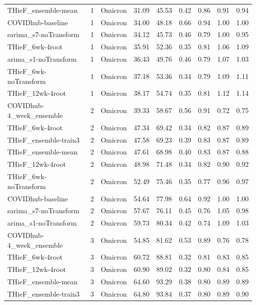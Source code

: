 \documentclass[thesis]{umassthesis}  %
\begin{document}
\begin{longtable}{lrlrrrrrr}
  THieF\_ensemble-mean & 1 & Omicron & 31.09 & 45.53 & 0.42 & 0.86 & 0.91 & 0.94 \\ 
  COVIDhub-baseline & 1 & Omicron & 34.00 & 48.18 & 0.66 & 0.94 & 1.00 & 1.00 \\ 
  sarima\_s7-noTransform & 1 & Omicron & 34.12 & 45.73 & 0.46 & 0.79 & 1.00 & 0.95 \\ 
  THieF\_6wk-4root & 1 & Omicron & 35.91 & 52.36 & 0.35 & 0.81 & 1.06 & 1.09 \\ 
  arima\_s1-noTransform & 1 & Omicron & 36.43 & 49.76 & 0.46 & 0.79 & 1.07 & 1.03 \\ 
  THieF\_6wk-noTransform & 1 & Omicron & 37.18 & 53.36 & 0.34 & 0.79 & 1.09 & 1.11 \\ 
  THieF\_12wk-4root & 1 & Omicron & 38.17 & 54.74 & 0.35 & 0.81 & 1.12 & 1.14 \\ 
  COVIDhub-4\_week\_ensemble & 2 & Omicron & 39.33 & 58.67 & 0.56 & 0.91 & 0.72 & 0.75 \\ 
  THieF\_6wk-4root & 2 & Omicron & 47.34 & 69.42 & 0.34 & 0.82 & 0.87 & 0.89 \\ 
  THieF\_ensemble-train3 & 2 & Omicron & 47.58 & 69.23 & 0.39 & 0.83 & 0.87 & 0.89 \\ 
  THieF\_ensemble-mean & 2 & Omicron & 47.61 & 68.98 & 0.40 & 0.83 & 0.87 & 0.88 \\ 
  THieF\_12wk-4root & 2 & Omicron & 48.98 & 71.48 & 0.34 & 0.82 & 0.90 & 0.92 \\ 
  THieF\_6wk-noTransform & 2 & Omicron & 52.49 & 75.46 & 0.35 & 0.77 & 0.96 & 0.97 \\ 
  COVIDhub-baseline & 2 & Omicron & 54.64 & 77.98 & 0.64 & 0.92 & 1.00 & 1.00 \\ 
  sarima\_s7-noTransform & 2 & Omicron & 57.67 & 76.11 & 0.45 & 0.76 & 1.05 & 0.98 \\ 
  arima\_s1-noTransform & 2 & Omicron & 59.73 & 80.34 & 0.42 & 0.74 & 1.09 & 1.03 \\ 
  COVIDhub-4\_week\_ensemble & 3 & Omicron & 54.85 & 81.62 & 0.53 & 0.89 & 0.76 & 0.78 \\ 
  THieF\_6wk-4root & 3 & Omicron & 60.72 & 88.81 & 0.32 & 0.81 & 0.83 & 0.85 \\ 
  THieF\_12wk-4root & 3 & Omicron & 60.90 & 89.02 & 0.32 & 0.80 & 0.84 & 0.85 \\ 
  THieF\_ensemble-mean & 3 & Omicron & 64.60 & 93.29 & 0.38 & 0.80 & 0.89 & 0.89 \\ 
  THieF\_ensemble-train3 & 3 & Omicron & 64.80 & 93.84 & 0.37 & 0.80 & 0.89 & 0.90 \\ 

\end{longtable}
\end{document}
